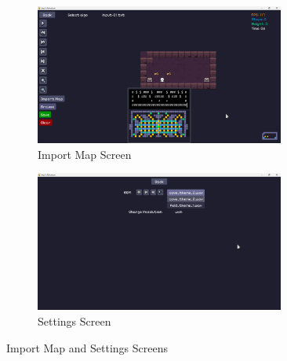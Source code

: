 \begin{figure}[!ht]
	\centering
	\begin{subfigure}{0.46\textwidth}
		\centering
		\includegraphics[width=0.9\textwidth]{imgs/screenshots/import-map.png}
		\caption{Import Map Screen}
	\end{subfigure}
	\hfill
	\begin{subfigure}{0.46\textwidth}
		\centering
		\includegraphics[width=0.9\textwidth]{imgs/screenshots/setting.png}
		\caption{Settings Screen}
	\end{subfigure}
	\caption{Import Map and Settings Screens}
\end{figure}
